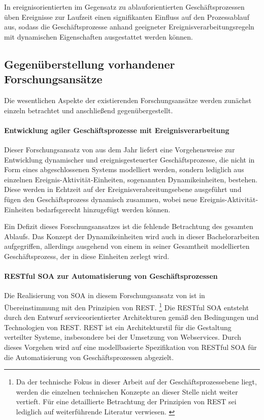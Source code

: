 In ereignisorientierten im Gegensatz zu ablauforientierten Geschäftsprozessen üben Ereignisse zur Laufzeit einen signifikanten Einfluss auf den Prozessablauf aus, sodass die Geschäftsprozesse anhand geeigneter Ereignisverarbeitungsregeln mit dynamischen Eigenschaften ausgestattet werden können. 

\subsection{Gegenüberstellung vorhandener Forschungsansätze}
Die wesentlichen Aspekte der existierenden Forschungsansätze werden zunächst einzeln betrachtet und anschließend gegenübergestellt.

\paragraph{Entwicklung agiler Geschäftsprozesse mit Ereignisverarbeitung}
Dieser Forschungsansatz von \citeauthor{Alexopoulou.2008} aus dem Jahr \citeyear{Alexopoulou.2008} liefert eine Vorgehensweise zur Entwicklung dynamischer und ereignisgesteuerter Geschäftsprozesse, die nicht in Form eines abgeschlossenen Systems modelliert werden, sondern lediglich aus einzelnen Ereignis-Aktivität-Einheiten, sogenannten Dynamikeinheiten, bestehen. 
\cite{Alexopoulou.2008} 
Diese werden in Echtzeit auf der Ereignisverabreitungsebene ausgeführt und fügen den Geschäftsprozess dynamisch zusammen, wobei neue Ereignis-Aktivität-Einheiten bedarfsgerecht hinzugefügt werden können. 

Ein Defizit dieses Forschungsansatzes ist die fehlende Betrachtung des gesamten Ablaufs. Das Konzept der Dynamikeinheiten wird auch in dieser Bachelorarbeiten aufgegriffen, allerdings ausgehend von einem in seiner Gesamtheit modellierten Geschäftsprozess, der in diese Einheiten zerlegt wird.

\paragraph{RESTful SOA zur Automatisierung von Geschäftsprozessen}
Die Realisierung von \ac{SOA} in diesem Forschungsansatz von \citeauthor{Wolf.2016} ist in Übereinstimmung mit den Prinzipien von \ac{REST}. 
\footnote{
Da der technische Fokus in dieser Arbeit auf der Geschäftsprozessebene liegt, werden die einzelnen technischen Konzepte an dieser Stelle nicht weiter vertieft.
Für eine detaillierte Betrachtung der Prinzipien von \ac{REST} sei lediglich auf weiterführende Literatur verwiesen.
\cite{Wolf.2016}\cite{Masak.2007}\cite{Finger.2009}}
Die \ac{REST}ful \ac{SOA} entsteht durch den Entwurf serviceorientierter Architekturen gemäß den Bedingungen und Technologien von \ac{REST}. \ac{REST} ist ein Architekturstil für die Gestaltung verteilter Systeme, insbesondere bei der Umsetzung von Webservices. Durch dieses Vorgehen wird auf eine modellbasierte Spezifikation von \ac{REST}ful \ac{SOA} für die Automatisierung von Geschäftsprozessen abgezielt. \cite{Wolf.2016}

